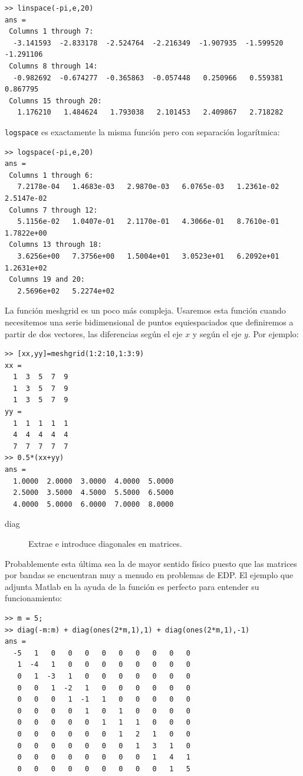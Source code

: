 \begin{verbatim}
>> linspace(-pi,e,20)
ans =
 Columns 1 through 7:
  -3.141593  -2.833178  -2.524764  -2.216349  -1.907935  -1.599520  -1.291106
 Columns 8 through 14:
  -0.982692  -0.674277  -0.365863  -0.057448   0.250966   0.559381   0.867795
 Columns 15 through 20:
   1.176210   1.484624   1.793038   2.101453   2.409867   2.718282
\end{verbatim}
\texttt{logspace} es exactamente la misma función pero con separación
logarítmica:

\begin{verbatim}
>> logspace(-pi,e,20)
ans =
 Columns 1 through 6:
   7.2178e-04   1.4683e-03   2.9870e-03   6.0765e-03   1.2361e-02   2.5147e-02
 Columns 7 through 12:
   5.1156e-02   1.0407e-01   2.1170e-01   4.3066e-01   8.7610e-01   1.7822e+00
 Columns 13 through 18:
   3.6256e+00   7.3756e+00   1.5004e+01   3.0523e+01   6.2092e+01   1.2631e+02
 Columns 19 and 20:
   2.5696e+02   5.2274e+02
\end{verbatim}
La función meshgrid es un poco más compleja. Usaremos esta función
cuando necesitemos una serie bidimensional de puntos equiespaciados
que definiremos a partir de dos vectores, las diferencias según el eje
$x$ y según el eje $y$. Por ejemplo:

\begin{verbatim}
>> [xx,yy]=meshgrid(1:2:10,1:3:9)
xx =
  1  3  5  7  9
  1  3  5  7  9
  1  3  5  7  9
yy =
  1  1  1  1  1
  4  4  4  4  4
  7  7  7  7  7
>> 0.5*(xx+yy)
ans =
  1.0000  2.0000  3.0000  4.0000  5.0000
  2.5000  3.5000  4.5000  5.5000  6.5000
  4.0000  5.0000  6.0000  7.0000  8.0000
\end{verbatim}
\begin{description}
\item [diag]Extrae e introduce diagonales en matrices.
\end{description}
Probablemente esta última sea la de mayor sentido físico puesto que
las matrices por bandas se encuentran muy a menudo en problemas de
EDP. El ejemplo que adjunta Matlab en la ayuda de la función es
perfecto para entender su funcionamiento:

\begin{verbatim}
>> m = 5;
>> diag(-m:m) + diag(ones(2*m,1),1) + diag(ones(2*m,1),-1)
ans =
  -5   1   0   0   0   0   0   0   0   0   0
   1  -4   1   0   0   0   0   0   0   0   0
   0   1  -3   1   0   0   0   0   0   0   0
   0   0   1  -2   1   0   0   0   0   0   0
   0   0   0   1  -1   1   0   0   0   0   0
   0   0   0   0   1   0   1   0   0   0   0
   0   0   0   0   0   1   1   1   0   0   0
   0   0   0   0   0   0   1   2   1   0   0
   0   0   0   0   0   0   0   1   3   1   0
   0   0   0   0   0   0   0   0   1   4   1
   0   0   0   0   0   0   0   0   0   1   5
\end{verbatim}

